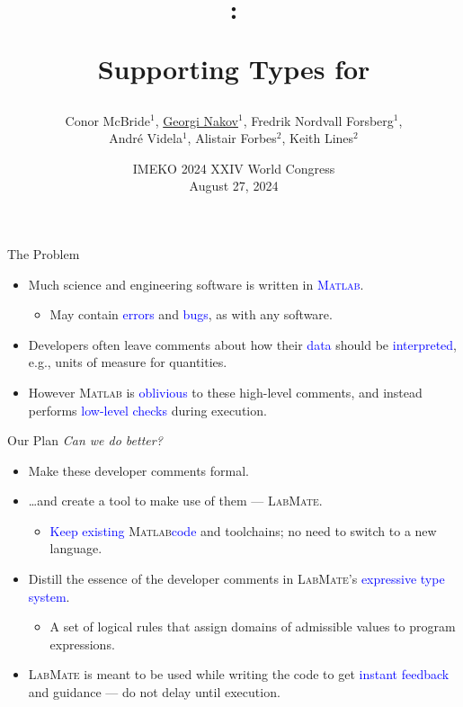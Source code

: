\documentclass[]{beamer}
\title{\huge \lm: \\ \centerline{Supporting Types for \ma} }
\author[McBride, Nakov, Nordvall Forsberg et al]{\small Conor McBride$^{1}$, \underline{Georgi Nakov}$^{1}$, Fredrik Nordvall Forsberg$^{1}$,\\ Andr\'e Videla$^{1}$, Alistair Forbes$^{2}$, Keith Lines$^{2}$}
\institute[]{$^{1}$University of Strathclyde, UK\\$^{2}$National Physical Laboratory, UK}
\date{IMEKO 2024 XXIV World Congress\\August 27, 2024}
\newcommand{\keyword}[1]{\textcolor{blue}{#1}}
\newcommand{\lm}{\textsc{LabMate}\xspace}
\newcommand{\ma}{\textsc{Matlab}\xspace}
\begin{document}
\begin{frame}[plain]
  \titlepage
\end{frame}

\setcounter{framenumber}{0}

\begin{frame}{The Problem}
  \begin{itemize}[<+->]
  \item Much science and engineering software is written in \keyword{\ma}.
    \smallskip
    \begin{itemize}[<.->]
    \item May contain \keyword{errors} and \keyword{bugs}, as with any software.
    \end{itemize}
    \bigskip
  \item Developers often leave comments about how their
    \keyword{data} should be \keyword{interpreted}, e.g., units of measure for
    quantities.
    \bigskip
  \item However \ma is \keyword{oblivious} to these high-level
    comments, and instead performs \keyword{low-level checks} during
    execution.
  \end{itemize}
\end{frame}

\begin{frame}{Our Plan}
  \textit{Can we do better?}

  \begin{itemize}[<+->]
    \medskip
  \item Make these developer comments formal.
    \medskip
  \item \ldots and create a tool to make use of them --- \lm.
    \begin{itemize}[<.->]
      \smallskip
    \item \keyword{Keep existing} \ma \keyword{code} and toolchains; no need to
      switch to a new language.
    \end{itemize}
    \medskip
  \item Distill the essence of the developer comments in
    \lm's \keyword{expressive type system}.
    \begin{itemize}[<.->]
      \smallskip
    \item A set of logical rules that assign domains of admissible
      values to program expressions.
    \end{itemize}
    \medskip
  \item \lm is meant to be used while writing the code to get
    \keyword{instant feedback} and guidance --- do not delay until
    execution.
  \end{itemize}
\end{frame}
\end{document}
